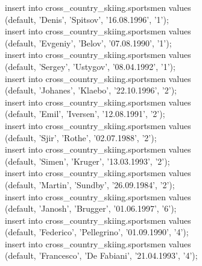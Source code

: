 \documentclass[a4paper,12pt]{article}
\begin{document}
insert into cross\_country\_skiing.sportsmen values \\
\indent \indent \indent \indent \indent \indent \indent (default, 'Denis', 'Spitsov', '16.08.1996',  '1');\\
insert into cross\_country\_skiing.sportsmen values \\
\indent \indent \indent \indent \indent \indent \indent (default, 'Evgeniy', 'Belov', '07.08.1990',  '1');\\
insert into cross\_country\_skiing.sportsmen values \\
\indent \indent \indent \indent \indent \indent \indent (default, 'Sergey',  'Ustygov', '08.04.1992',  '1');\\
insert into cross\_country\_skiing.sportsmen values \\
\indent \indent \indent \indent \indent \indent \indent (default, 'Johanes', 'Klaebo',  '22.10.1996',  '2');\\
insert into cross\_country\_skiing.sportsmen values \\
\indent \indent \indent \indent \indent \indent \indent (default, 'Emil',  'Iversen', '12.08.1991',  '2');\\
insert into cross\_country\_skiing.sportsmen values \\
\indent \indent \indent \indent \indent \indent \indent (default, 'Sjir',  'Rothe', '02.07.1988',   '2');\\
insert into cross\_country\_skiing.sportsmen values \\
\indent \indent \indent \indent \indent \indent \indent (default, 'Simen', 'Kruger',  '13.03.1993',  '2');\\
insert into cross\_country\_skiing.sportsmen values \\
\indent \indent \indent \indent \indent \indent \indent (default, 'Martin',  'Sundby',  '26.09.1984',  '2');\\
insert into cross\_country\_skiing.sportsmen values \\
\indent \indent \indent \indent \indent \indent \indent (default, 'Janosh',  'Brugger', '01.06.1997',  '6');\\
insert into cross\_country\_skiing.sportsmen values \\
\indent \indent \indent \indent \indent \indent \indent (default, 'Federico',  'Pellegrino',  '01.09.1990',  '4');\\
insert into cross\_country\_skiing.sportsmen values \\
\indent \indent \indent \indent \indent \indent \indent (default, 'Francesco', 'De Fabiani',  '21.04.1993',  '4');\\
\end{document}
